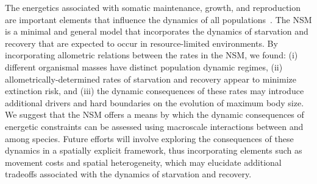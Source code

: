 \documentclass{pnastwo}
\begin{document}
\begin{article}
The energetics associated with somatic maintenance, growth, and reproduction are important elements that influence the dynamics of all populations~\cite{Stearns:1989ip}.
The NSM is a minimal and general model that incorporates the dynamics of starvation and recovery that are expected to occur in resource-limited environments.
By incorporating allometric relations between the rates in the NSM, we found: (i) different organismal masses have distinct population dynamic regimes, (ii) allometrically-determined rates of starvation and recovery appear to minimize extinction risk, and (iii) the dynamic consequences of these rates may introduce additional drivers and hard boundaries on the evolution of maximum body size.
We suggest that the NSM offers a means by which the dynamic consequences of energetic constraints can be assessed using macroscale interactions between and among species.
Future efforts will involve exploring the consequences of these dynamics in a spatially explicit framework, thus incorporating elements such as movement costs and spatial heterogeneity, which may elucidate additional tradeoffs associated with the dynamics of starvation and recovery.

%
%
%
%
%
%
%
%
%
%
%
%
%




\end{article}
\end{document}
